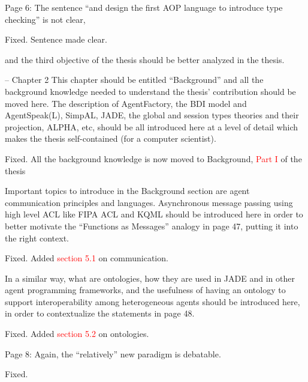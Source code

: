 \documentclass{article}
\newcommand*\R[1]{\textcolor{red}{#1}} %
\newcommand{\todo}[1]{[\textcolor{green}{TODO}: #1]}
\newenvironment{them}{\noindent\begingroup\color{blue}}{\endgroup\par}
\begin{document}
\begin{them}

Page 6:
The sentence “and design the first AOP language to introduce type checking” is
not clear,

\end{them}
Fixed. Sentence made clear. 

\begin{them}

and the third objective of the thesis should be better analyzed in
the thesis.

\end{them}
\todo{} 

\begin{them}

-- Chapter 2
This chapter should be entitled “Background” and all the background knowledge
needed to understand the thesis' contribution should be moved here. The
description of AgentFactory, the BDI model and AgentSpeak(L), SimpAL, JADE, the
global and session types theories and their projection, ALPHA, etc, should be
all introduced here at a level of detail which makes the thesis self-contained
(for a computer scientist).

\end{them}
Fixed. All the background knowledge is now moved to Background, \R{Part I} of
the thesis

\begin{them}

Important topics to introduce in the Background section are agent communication
principles and languages. Asynchronous message passing using high level ACL
like FIPA ACL and KQML should be introduced here in order to better motivate
the “Functions as Messages” analogy in page 47, putting it into the right
context.

\end{them}
Fixed. Added \R{section 5.1} on communication.

\begin{them}

In a similar way, what are ontologies, how they are used in JADE and in other
agent programming frameworks, and the usefulness of having an ontology to
support interoperability among heterogeneous agents should be introduced here,
in order to contextualize the statements in page 48.

\end{them}
Fixed. Added \R{section 5.2} on ontologies.

\begin{them}

Page 8:
Again, the “relatively” new paradigm is debatable.
\end{them}
Fixed. 
\end{document}
